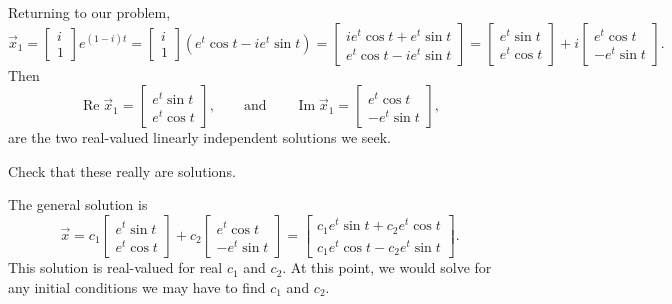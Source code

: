 Returning to our problem,
\begin{equation*}
\vec{x}_1 =
\begin{bmatrix} i \\ 1 \end{bmatrix} e^{(1-i)t}
=
\begin{bmatrix} i \\ 1 \end{bmatrix} \left( e^t \cos t - i e^t \sin t \right)
=
\begin{bmatrix}
i e^t \cos t + e^t \sin t  \\
e^t \cos t - i e^t \sin t
\end{bmatrix}
=
\begin{bmatrix}
e^t \sin t  \\
e^t \cos t
\end{bmatrix}
+ i
\begin{bmatrix}
e^t \cos t  \\
- e^t \sin t
\end{bmatrix}
.
\end{equation*}
Then
\begin{equation*}
\operatorname{Re} \vec{x}_1 = 
\begin{bmatrix}
e^t \sin t  \\
e^t \cos t
\end{bmatrix} ,
\qquad \text{and} \qquad
\operatorname{Im} \vec{x}_1 = 
\begin{bmatrix}
e^t \cos t \\
- e^t \sin t
\end{bmatrix} ,
\end{equation*}
are the two real-valued linearly independent solutions we seek.

\begin{exercise}
Check that these really are solutions.
\end{exercise}

The general solution is
\begin{equation*}
\vec{x}
=
c_1
\begin{bmatrix}
e^t \sin t  \\
e^t \cos t
\end{bmatrix} 
+ c_2
\begin{bmatrix}
e^t \cos t \\
-e^t \sin t
\end{bmatrix} 
=
\begin{bmatrix}
c_1 e^t \sin t + c_2 e^t \cos t \\
c_1 e^t \cos t - c_2 e^t \sin t
\end{bmatrix} .
\end{equation*}
This solution is real-valued for real $c_1$ and $c_2$.  At this point, we would solve
for any initial conditions we may have to find $c_1$ and $c_2$.

